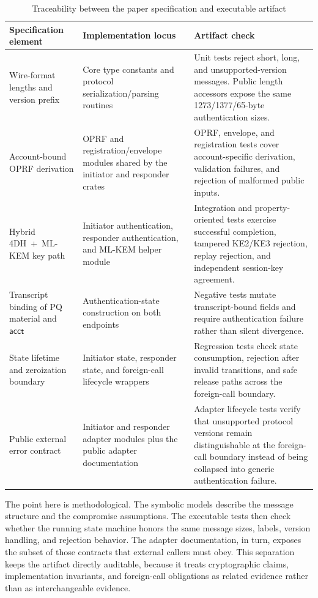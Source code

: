 \documentclass{ieeeijc}
\newcommand{\acct}{\mathsf{acct}}
\theoremstyle{remark}
\begin{document}
\begin{table}[t]
\caption{Traceability between the paper specification and executable artifact}
\label{tab:traceability}
\centering\scriptsize
\begin{tabularx}{\textwidth}{@{}L{3.0cm}L{4.8cm}X@{}}
\toprule
Specification element & Implementation locus & Artifact check \\
\midrule
Wire-format lengths and version prefix & Core type constants and
protocol serialization/parsing routines & Unit tests reject short,
long, and unsupported-version messages. Public length accessors expose the
same 1273/1377/65-byte authentication sizes. \\
Account-bound OPRF derivation & OPRF and registration/envelope modules
shared by the initiator and responder crates & OPRF, envelope, and registration
tests cover account-specific derivation, validation failures, and
rejection of malformed public inputs. \\
Hybrid 4DH~+~ML-KEM key path & Initiator authentication, responder
authentication, and ML-KEM helper module & Integration and
property-oriented tests exercise successful completion, tampered KE2/KE3
rejection, replay rejection, and independent session-key agreement. \\
Transcript binding of PQ material and $\acct$ & Authentication-state
construction on both endpoints & Negative tests mutate transcript-bound
fields and require authentication failure rather than silent divergence. \\
State lifetime and zeroization boundary & Initiator state, responder state, and
foreign-call lifecycle wrappers & Regression tests check state consumption,
rejection after invalid transitions, and safe release paths across the
foreign-call boundary. \\
Public external error contract & Initiator and responder adapter modules plus the public
adapter documentation & Adapter lifecycle tests verify that unsupported protocol
versions remain distinguishable at the foreign-call boundary instead of being
collapsed into generic authentication failure. \\
\bottomrule
\end{tabularx}
\end{table}

The point here is methodological. The symbolic models describe the
message structure and the compromise assumptions. The executable tests
then check whether the running state machine honors the same message
sizes, labels, version handling, and rejection behavior. The adapter
documentation, in turn, exposes the subset of those contracts that
external callers must obey. This separation keeps the artifact directly
auditable, because it treats cryptographic claims, implementation
invariants, and foreign-call obligations as related evidence rather than
as interchangeable evidence.
\end{document}
